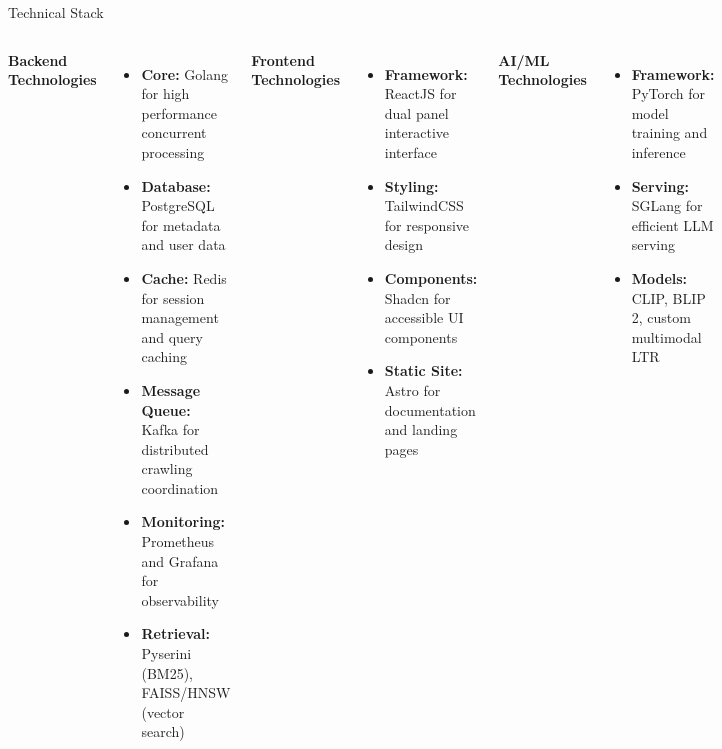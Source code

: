 \documentclass[aspectratio=169,xcolor=dvipsnames]{beamer}
\begin{document}
\begin{frame}{Technical Stack}
    \begin{columns}[t]
        \textbf{Backend Technologies}
        \begin{itemize}
            \item \textbf{Core:} Golang for high performance concurrent processing
            \item \textbf{Database:} PostgreSQL for metadata and user data
            \item \textbf{Cache:} Redis for session management and query caching
            \item \textbf{Message Queue:} Kafka for distributed crawling coordination
            \item \textbf{Monitoring:} Prometheus and Grafana for observability
            \item \textbf{Retrieval:} Pyserini (BM25), FAISS/HNSW (vector search)
        \end{itemize}
        
        \textbf{Frontend Technologies}
        \begin{itemize}
            \item \textbf{Framework:} ReactJS for dual panel interactive interface
            \item \textbf{Styling:} TailwindCSS for responsive design
            \item \textbf{Components:} Shadcn for accessible UI components
            \item \textbf{Static Site:} Astro for documentation and landing pages
        \end{itemize}
        
        \vspace{0.5em}
        \textbf{AI/ML Technologies}
        \begin{itemize}
            \item \textbf{Framework:} PyTorch for model training and inference
            \item \textbf{Serving:} SGLang for efficient LLM serving
            \item \textbf{Models:} CLIP, BLIP 2, custom multimodal LTR
        \end{itemize}
    \end{columns}
\end{frame}
\end{document}
